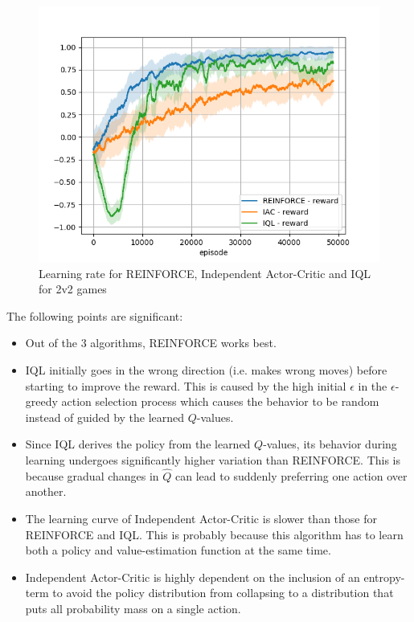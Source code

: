 \begin{figure}[htp]
    \centering
    \includegraphics[width=14cm]{images/experiment4/compare_reward.png}
    \caption{Learning rate for REINFORCE, Independent Actor-Critic and IQL for 2v2 games}
    \label{fig:compare_reward}
\end{figure}

The following points are significant:
\begin{itemize}
    \item Out of the 3 algorithms, REINFORCE works best.
    \item IQL initially goes in the wrong direction (i.e. makes wrong moves) before starting to improve the reward. This is caused by the high initial $\epsilon$ in the $\epsilon$-greedy action selection process which causes the behavior to be random instead of guided by the learned $Q$-values.
    \item Since IQL derives the policy from the learned $Q$-values, its behavior during learning undergoes significantly higher variation than REINFORCE. This is because gradual changes in $\hat Q$ can lead to suddenly preferring one action over another.
    \item The learning curve of Independent Actor-Critic is slower than those for REINFORCE and IQL. This is probably because this algorithm has to learn both a policy and value-estimation function at the same time.
    \item Independent Actor-Critic is highly dependent on the inclusion of an entropy-term to avoid the policy distribution from collapsing to a distribution that puts all probability mass on a single action.
\end{itemize}

